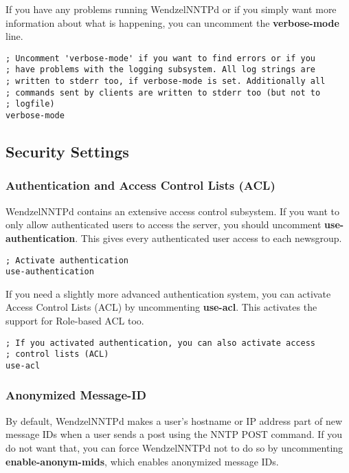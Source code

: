 \documentclass[12pt,fleqn,leqno]{scrbook}
\begin{document}
If you have any problems running WendzelNNTPd or if you simply want more
information about what is happening, you can uncomment the
\textbf{verbose-mode} line.

\begin{verbatim}
; Uncomment 'verbose-mode' if you want to find errors or if you
; have problems with the logging subsystem. All log strings are
; written to stderr too, if verbose-mode is set. Additionally all
; commands sent by clients are written to stderr too (but not to
; logfile)
verbose-mode
\end{verbatim}

\hypertarget{security-settings}{%
\subsection{Security Settings}\label{security-settings}}

\hypertarget{authentication-and-access-control-lists-acl}{%
\subsubsection{Authentication and Access Control Lists
(ACL)}\label{authentication-and-access-control-lists-acl}}

WendzelNNTPd contains an extensive access control subsystem. If you want
to only allow authenticated users to access the server, you should
uncomment \textbf{use-authentication}. This gives every authenticated
user access to each newsgroup.

\begin{verbatim}
; Activate authentication
use-authentication
\end{verbatim}

If you need a slightly more advanced authentication system, you can
activate Access Control Lists (ACL) by uncommenting \textbf{use-acl}.
This activates the support for Role-based ACL too.

\begin{verbatim}
; If you activated authentication, you can also activate access
; control lists (ACL)
use-acl
\end{verbatim}

\hypertarget{anonymized-message-id}{%
\subsubsection{Anonymized Message-ID}\label{anonymized-message-id}}

By default, WendzelNNTPd makes a user's hostname or IP address part of
new message IDs when a user sends a post using the NNTP POST command. If
you do not want that, you can force WendzelNNTPd not to do so by
uncommenting \textbf{enable-anonym-mids}, which enables anonymized
message IDs.
\end{document}
